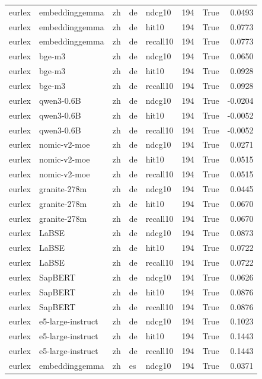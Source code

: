 \begin{tabular}{lllllrrr}
eurlex & embeddinggemma & zh & de & ndcg10 & 194 & True & 0.0493 \\
eurlex & embeddinggemma & zh & de & hit10 & 194 & True & 0.0773 \\
eurlex & embeddinggemma & zh & de & recall10 & 194 & True & 0.0773 \\
eurlex & bge-m3 & zh & de & ndcg10 & 194 & True & 0.0650 \\
eurlex & bge-m3 & zh & de & hit10 & 194 & True & 0.0928 \\
eurlex & bge-m3 & zh & de & recall10 & 194 & True & 0.0928 \\
eurlex & qwen3-0.6B & zh & de & ndcg10 & 194 & True & -0.0204 \\
eurlex & qwen3-0.6B & zh & de & hit10 & 194 & True & -0.0052 \\
eurlex & qwen3-0.6B & zh & de & recall10 & 194 & True & -0.0052 \\
eurlex & nomic-v2-moe & zh & de & ndcg10 & 194 & True & 0.0271 \\
eurlex & nomic-v2-moe & zh & de & hit10 & 194 & True & 0.0515 \\
eurlex & nomic-v2-moe & zh & de & recall10 & 194 & True & 0.0515 \\
eurlex & granite-278m & zh & de & ndcg10 & 194 & True & 0.0445 \\
eurlex & granite-278m & zh & de & hit10 & 194 & True & 0.0670 \\
eurlex & granite-278m & zh & de & recall10 & 194 & True & 0.0670 \\
eurlex & LaBSE & zh & de & ndcg10 & 194 & True & 0.0873 \\
eurlex & LaBSE & zh & de & hit10 & 194 & True & 0.0722 \\
eurlex & LaBSE & zh & de & recall10 & 194 & True & 0.0722 \\
eurlex & SapBERT & zh & de & ndcg10 & 194 & True & 0.0626 \\
eurlex & SapBERT & zh & de & hit10 & 194 & True & 0.0876 \\
eurlex & SapBERT & zh & de & recall10 & 194 & True & 0.0876 \\
eurlex & e5-large-instruct & zh & de & ndcg10 & 194 & True & 0.1023 \\
eurlex & e5-large-instruct & zh & de & hit10 & 194 & True & 0.1443 \\
eurlex & e5-large-instruct & zh & de & recall10 & 194 & True & 0.1443 \\
eurlex & embeddinggemma & zh & es & ndcg10 & 194 & True & 0.0371 \\

\end{tabular}
